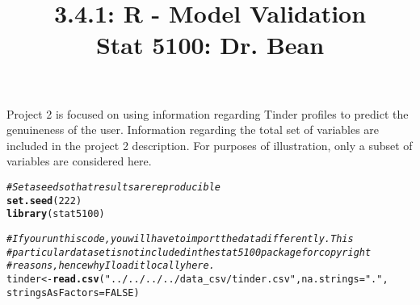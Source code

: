 \documentclass{article}\usepackage[]{graphicx}\usepackage[]{color}
\makeatletter
\newcommand{\hlnum}[1]{\textcolor[rgb]{0.686,0.059,0.569}{#1}}%
\newcommand{\hlstr}[1]{\textcolor[rgb]{0.192,0.494,0.8}{#1}}%
\newcommand{\hlcom}[1]{\textcolor[rgb]{0.678,0.584,0.686}{\textit{#1}}}%
\newcommand{\hlstd}[1]{\textcolor[rgb]{0.345,0.345,0.345}{#1}}%
\newcommand{\hlkwb}[1]{\textcolor[rgb]{0.69,0.353,0.396}{#1}}%
\newcommand{\hlkwc}[1]{\textcolor[rgb]{0.333,0.667,0.333}{#1}}%
\newcommand{\hlkwd}[1]{\textcolor[rgb]{0.737,0.353,0.396}{\textbf{#1}}}%
\newenvironment{kframe}{%
 \def\at@end@of@kframe{}%
 \ifinner\ifhmode%
  \def\at@end@of@kframe{\end{minipage}}%
  \begin{minipage}{\columnwidth}%
 \fi\fi%
 \def\FrameCommand##1{\hskip\@totalleftmargin \hskip-\fboxsep
 \colorbox{shadecolor}{##1}\hskip-\fboxsep
     \hskip-\linewidth \hskip-\@totalleftmargin \hskip\columnwidth}%
 \MakeFramed {\advance\hsize-\width
   \@totalleftmargin\z@ \linewidth\hsize
   \@setminipage}}%
 {\par\unskip\endMakeFramed%
 \at@end@of@kframe}
\newenvironment{knitrout}{}{} %
\makeatother
\begin{document}
\title{%
  3.4.1: R - Model Validation \\
  \smallskip
  \large Stat 5100: Dr. Bean
}
\date{}

\maketitle

Project 2 is focused on using information regarding Tinder profiles
to predict the genuineness of the user. Information regarding the total
set of variables are included in the project 2 description. For purposes
of illustration, only a subset of variables are considered here.

\begin{knitrout}
\color{fgcolor}\begin{kframe}
\begin{alltt}
\hlcom{# Set a seed so that results are reproducible}
\hlkwd{set.seed}\hlstd{(}\hlnum{222}\hlstd{)}
\hlkwd{library}\hlstd{(stat5100)}

\hlcom{# If you run this code, you will have to import the data differently. This}
\hlcom{# particular dataset is not included in the stat5100 package for copyright}
\hlcom{# reasons, hence why I load it locally here.}
\hlstd{tinder} \hlkwb{<-} \hlkwd{read.csv}\hlstd{(}\hlstr{"../../../../data_csv/tinder.csv"}\hlstd{,} \hlkwc{na.strings} \hlstd{=} \hlstr{"."}\hlstd{,}
                   \hlkwc{stringsAsFactors} \hlstd{=} \hlnum{FALSE}\hlstd{)}


\end{alltt}
\end{kframe}
\end{knitrout}
\end{document}
